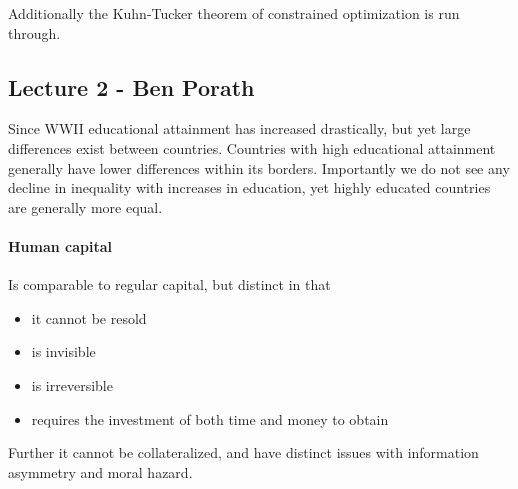 \documentclass[12pt, a4paper]{article}
\begin{document}
\begin{multicols}{2}
Additionally the Kuhn-Tucker theorem of constrained optimization is run through.

\subsection{Lecture 2 - Ben Porath}
Since WWII educational attainment has increased drastically, but yet large differences exist between countries. Countries with high educational attainment generally have lower differences within its borders. Importantly we do not see any decline in inequality with increases in education, yet highly educated countries are generally more equal.

\paragraph{Human capital}
Is comparable to regular capital, but distinct in that 
\begin{itemize}
\item it cannot be resold 
\item is invisible 
\item is irreversible
\item requires the investment of both time and money to obtain
\end{itemize}
Further it cannot be collateralized, and have distinct issues with information asymmetry and moral hazard.


\end{multicols}
\end{document}
